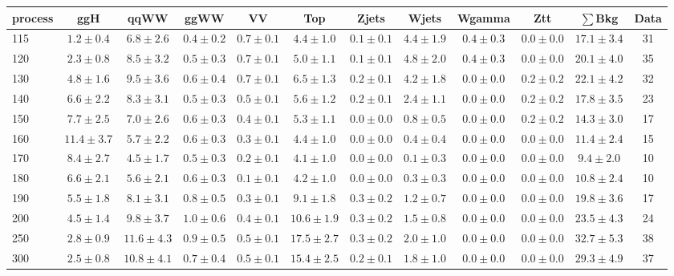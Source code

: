 \begin{table}
{\footnotesize
 \begin{center}
 \begin{tabular}{l c c c c c c c c c c c }
 \hline
 process & ggH & qqWW & ggWW & VV & Top & Zjets & Wjets & Wgamma & Ztt & $\sum$Bkg & Data \\
 \hline
115 & $1.2\pm0.4$ & $6.8\pm2.6$ & $0.4\pm0.2$ & $0.7\pm0.1$ & $4.4\pm1.0$ & $0.1\pm0.1$ & $4.4\pm1.9$ & $0.4\pm0.3$ & $0.0\pm0.0$ & $17.1\pm3.4$ & 31 \\
120 & $2.3\pm0.8$ & $8.5\pm3.2$ & $0.5\pm0.3$ & $0.7\pm0.1$ & $5.0\pm1.1$ & $0.1\pm0.1$ & $4.8\pm2.0$ & $0.4\pm0.3$ & $0.0\pm0.0$ & $20.1\pm4.0$ & 35 \\
130 & $4.8\pm1.6$ & $9.5\pm3.6$ & $0.6\pm0.4$ & $0.7\pm0.1$ & $6.5\pm1.3$ & $0.2\pm0.1$ & $4.2\pm1.8$ & $0.0\pm0.0$ & $0.2\pm0.2$ & $22.1\pm4.2$ & 32 \\
140 & $6.6\pm2.2$ & $8.3\pm3.1$ & $0.5\pm0.3$ & $0.5\pm0.1$ & $5.6\pm1.2$ & $0.2\pm0.1$ & $2.4\pm1.1$ & $0.0\pm0.0$ & $0.2\pm0.2$ & $17.8\pm3.5$ & 23 \\
150 & $7.7\pm2.5$ & $7.0\pm2.6$ & $0.6\pm0.3$ & $0.4\pm0.1$ & $5.3\pm1.1$ & $0.0\pm0.0$ & $0.8\pm0.5$ & $0.0\pm0.0$ & $0.2\pm0.2$ & $14.3\pm3.0$ & 17 \\
160 & $11.4\pm3.7$ & $5.7\pm2.2$ & $0.6\pm0.3$ & $0.3\pm0.1$ & $4.4\pm1.0$ & $0.0\pm0.0$ & $0.4\pm0.4$ & $0.0\pm0.0$ & $0.0\pm0.0$ & $11.4\pm2.4$ & 15 \\
170 & $8.4\pm2.7$ & $4.5\pm1.7$ & $0.5\pm0.3$ & $0.2\pm0.1$ & $4.1\pm1.0$ & $0.0\pm0.0$ & $0.1\pm0.3$ & $0.0\pm0.0$ & $0.0\pm0.0$ & $9.4\pm2.0$ & 10 \\
180 & $6.6\pm2.1$ & $5.6\pm2.1$ & $0.6\pm0.3$ & $0.1\pm0.1$ & $4.2\pm1.0$ & $0.0\pm0.0$ & $0.3\pm0.3$ & $0.0\pm0.0$ & $0.0\pm0.0$ & $10.8\pm2.4$ & 10 \\
190 & $5.5\pm1.8$ & $8.1\pm3.1$ & $0.8\pm0.5$ & $0.3\pm0.1$ & $9.1\pm1.8$ & $0.3\pm0.2$ & $1.2\pm0.7$ & $0.0\pm0.0$ & $0.0\pm0.0$ & $19.8\pm3.6$ & 17 \\
200 & $4.5\pm1.4$ & $9.8\pm3.7$ & $1.0\pm0.6$ & $0.4\pm0.1$ & $10.6\pm1.9$ & $0.3\pm0.2$ & $1.5\pm0.8$ & $0.0\pm0.0$ & $0.0\pm0.0$ & $23.5\pm4.3$ & 24 \\
250 & $2.8\pm0.9$ & $11.6\pm4.3$ & $0.9\pm0.5$ & $0.5\pm0.1$ & $17.5\pm2.7$ & $0.3\pm0.2$ & $2.0\pm1.0$ & $0.0\pm0.0$ & $0.0\pm0.0$ & $32.7\pm5.3$ & 38 \\
300 & $2.5\pm0.8$ & $10.8\pm4.1$ & $0.7\pm0.4$ & $0.5\pm0.1$ & $15.4\pm2.5$ & $0.2\pm0.1$ & $1.8\pm1.0$ & $0.0\pm0.0$ & $0.0\pm0.0$ & $29.3\pm4.9$ & 37 \\

\end{tabular}
\end{center}}
\end{table}
